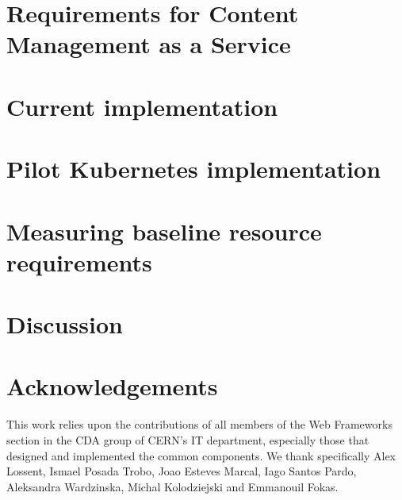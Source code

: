 \documentclass{webofc}
\begin{document}
\section{Requirements for Content Management as a Service}
\label{sec-drupalsvc}


\section{Current implementation}
\label{sec-phys-infra}


\section{Pilot Kubernetes implementation}
\label{sec-k8s-design}


\section{Measuring baseline resource requirements}
\label{sec-experiment}


\section{Discussion}
\label{sec-discussion}


\section*{Acknowledgements}

This work relies upon the contributions of all members of the Web Frameworks section in the CDA group of CERN's IT department,
especially those that designed and implemented the common components.
We thank specifically Alex Lossent, Ismael Posada Trobo, Joao Esteves Marcal, Iago Santos Pardo, Aleksandra Wardzinska, Michal Kolodziejski and Emmanouil Fokas.


\end{document}
